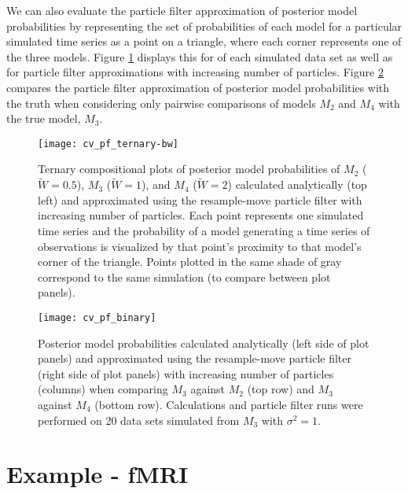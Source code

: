 \documentclass{article}
\begin{document}

We can also evaluate the particle filter approximation of posterior model probabilities by representing the set of probabilities of each model for a particular simulated time series as a point on a triangle, where each corner represents one of the three models. Figure \ref{fig:ternary} displays this for of each simulated data set as well as for particle filter approximations with increasing number of particles. Figure \ref{fig:binary} compares the particle filter approximation of posterior model probabilities with the truth when considering only pairwise comparisons of models $M_2$ and $M_4$ with the true model, $M_3$.

\begin{figure}
\texttt{[image: cv\_pf\_ternary-bw]}
\caption{Ternary compositional plots of posterior model probabilities of $M_2$ ($\tilde{W} = 0.5$), $M_3$ ($\tilde{W} = 1$), and $M_4$ ($\tilde{W} = 2$) calculated analytically (top left) and approximated using the resample-move particle filter with increasing number of particles. Each point represents one simulated time series and the probability of a model generating a time series of observations is visualized by that point's proximity to that model's corner of the triangle. Points plotted in the same shade of gray correspond to the same simulation (to compare between plot panels).} \label{fig:ternary}
\end{figure}

\begin{figure}
\texttt{[image: cv\_pf\_binary]}
\caption{Posterior model probabilities calculated analytically (left side of plot panels) and approximated using the resample-move particle filter (right side of plot panels) with increasing number of particles (columns) when comparing $M_3$ against $M_2$ (top row) and $M_3$ against $M_4$ (bottom row). Calculations and particle filter runs were performed on 20 data sets simulated from $M_3$ with $\sigma^2 = 1$.} \label{fig:binary}
\end{figure}

\clearpage

\section{Example - fMRI}
\end{document}
